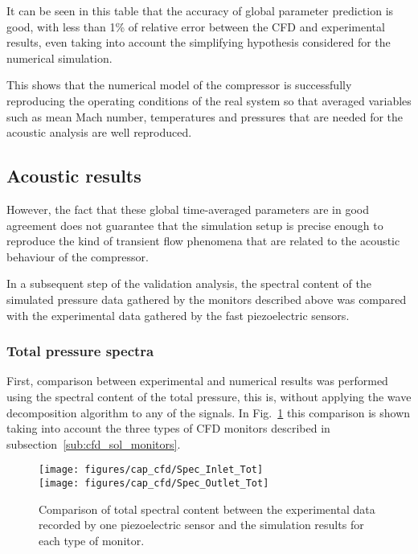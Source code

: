 It can be seen in this table that the accuracy of global parameter prediction is good, with less than 1\% of relative error between the CFD and experimental results, even taking into account the simplifying hypothesis considered for the numerical simulation.

This shows that the numerical model of the compressor is successfully reproducing the operating conditions of the real system so that averaged variables such as mean Mach number, temperatures and pressures that are needed for the acoustic analysis are well reproduced.

\subsection{Acoustic results}

However, the fact that these global time-averaged parameters are in good agreement does not guarantee that the simulation setup is precise enough to reproduce the kind of transient flow phenomena that are related to the acoustic behaviour of the compressor.

In a subsequent step of the validation analysis, the spectral content of the simulated pressure data gathered by the monitors described above was compared with the experimental data gathered by the fast piezoelectric sensors.

\subsubsection{Total pressure spectra}

First, comparison between experimental and numerical results was performed using the spectral content of the total pressure, this is, without applying the wave decomposition algorithm to any of the signals. In Fig.~\ref{fig:cfd_Spec_Inlet_Tot} this comparison is shown taking into account the three types of CFD monitors described in subsection~\ref{sub:cfd_sol_monitors}.

\begin{figure}[htb!]
\centering
\texttt{[image: figures/cap\_cfd/Spec\_Inlet\_Tot]}\\[5mm]
\texttt{[image: figures/cap\_cfd/Spec\_Outlet\_Tot]}
\caption[Comparison of spectral content (CFD vs. Exp.)]{Comparison of total spectral content between the experimental data recorded by one piezoelectric sensor and the simulation results for each type of monitor.}
\label{fig:cfd_Spec_Inlet_Tot}
\end{figure}

